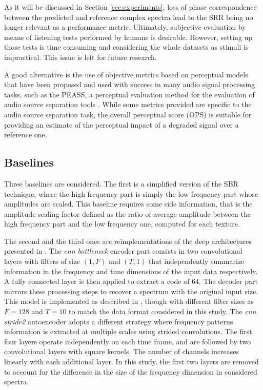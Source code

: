 \documentclass{article}
\begin{document}
As it will be discussed in Section \ref{sec:experiments}, loss of phase correspondence between the predicted and reference complex spectra lead to the SRR being no longer relevant as a performance metric. Ultimately, subjective evaluation by means of listening tests performed by humans is desirable. However, setting up those tests is time consuming and considering the whole datasets as stimuli is impractical. This issue is left for future research.

A good alternative is the use of objective metrics based on perceptual models that have been proposed and used with success in many audio signal processing tasks, such as the PEASS, a perceptual evaluation method for the evaluation of audio source separation tools \cite{emiya2011subjective}. While some metrics provided are specific to the  audio source separation task, the overall perceptual score (OPS) is suitable for providing an estimate of the perceptual impact of a degraded signal over a reference one.


\subsection{Baselines}

Three baselines are considered. The first is a simplified version of the SBR technique, where the high frequency part is simply the low frequency part whose amplitudes are scaled. This baseline requires some side information, that is the amplitude scaling factor defined as the ratio of average amplitude between the high frequency part and the low frequency one, computed for each texture.

The second and the third ones are reimplementations of the deep architectures presented in \cite{miron2018high}. The \textit{cnn bottleneck} encoder part consists in two convolutional layers with filters of size $(1, F)$ and $(T, 1)$ that independently summarize information in the frequency and time dimensions of the input data respectively. A fully connected layer is then applied to extract a code of $64$. The decoder part mirrors these processing steps to recover a spectrum with the original input size. This model is implemented as described in \cite{miron2018high}, though with different filter sizes as $F=128$ and $T=10$ to match the data format considered in this study. The \textit{cnn stride2} autoencoder adopts a different strategy where frequency patterns information is extracted at multiple scales using strided convolutions. The first four layers operate independently on each time frame, and are followed by two convolutional layers with square kernels. The number of channels increases linearly with each additional layer. In this study, the first two layers are removed to account for the difference in the size of the frequency dimension in considered spectra. %
\end{document}
